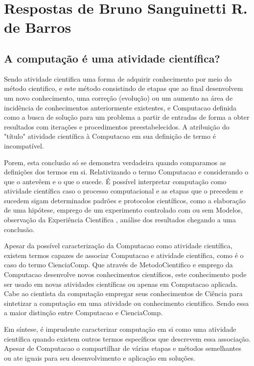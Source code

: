 \section{Respostas de Bruno Sanguinetti R. de Barros}

\subsection{A computação é uma atividade científica?}

Sendo atividade cientifica uma forma de adquirir conhecimento por meio do método cientifico, e este método consistindo de etapas que ao final desenvolvem um novo conhecimento, uma correção (evolução) ou um aumento na área de incidência de conhecimentos anteriormente existentes, e \gls{Computacao} definida como a busca de solução para um problema a partir de entradas de forma a obter resultados com iterações e procedimentos preestabelecidos. A atribuição do "título" atividade científica à  \gls{Computacao} em sua definição de termo é incompatível.

Porem, esta conclusão só se demonstra verdadeira quando comparamos as definições dos termos em si. Relativizando o termo  \gls{Computacao} e considerando o que o antevêem e o que o sucede. É possível interpretar computação como atividade científica caso o processo computacional e as etapas que o precedem e sucedem sigam determinados padrões e protocolos científicos, como a elaboração de uma hipótese, emprego de um experimento controlado com ou sem  \gls{Modelos}, observação da \gls{Experiência Científica} , análise dos resultados chegando a uma conclusão.

Apesar da possível caracterização da \gls{Computacao} como atividade científica, existem termos capazes de associar \gls{Computacao} e atividade científica, como é o caso do termo \gls{CienciaComp}. Que através de \gls{MetodoCientifico} e emprego da  \gls{Computacao} desenvolve novos conhecimentos científicos, este conhecimento pode ser usado em novas atividades científicas ou apenas em \gls{Computacao} aplicada. Cabe ao cientista da computação empregar seus conhecimentos de \gls{Ciência} para sintetizar a computação em uma atividade ou conhecimento cientifico. Sendo essa a maior distinção entre \gls{Computacao} e \gls{CienciaComp}.

Em síntese, é imprudente caracterizar computação em si como uma atividade científica quando existem outros termos específicos que descrevem essa associação. Apesar de  \gls{Computacao} o compartilhar de várias etapas e métodos semelhantes ou ate iguais para seu desenvolvimento e aplicação em soluções.